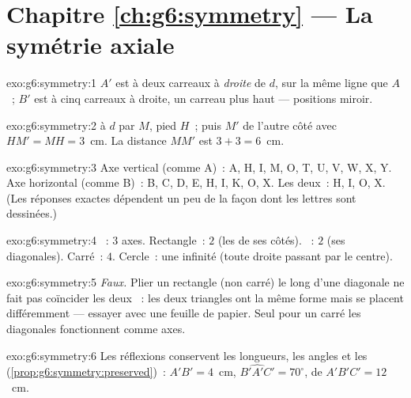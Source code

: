 \section*{Chapitre \ref{ch:g6:symmetry} --- La symétrie axiale}

\begin{solution}{exo:g6:symmetry:1}
$A'$ est à deux carreaux à \emph{droite} de $d$, sur la même ligne
que $A$~; $B'$ est à cinq carreaux à droite, un carreau plus haut ---
positions miroir.
\end{solution}

\begin{solution}{exo:g6:symmetry:2}
 à $d$ par $M$, pied $H$~; puis $M'$ de l'autre côté
avec $HM' = MH = 3$~cm. La distance $MM'$ est $3 + 3 = 6$~cm.
\end{solution}

\begin{solution}{exo:g6:symmetry:3}
Axe vertical (comme A)~: A, H, I, M, O, T, U, V, W, X, Y.
Axe horizontal (comme B)~: B, C, D, E, H, I, K, O, X.
Les deux~: H, I, O, X.
(Les réponses exactes dépendent un peu de la façon dont les lettres
sont dessinées.)
\end{solution}

\begin{solution}{exo:g6:symmetry:4}
~: $3$ axes. Rectangle~: $2$ (les  de
ses côtés). ~: $2$ (ses diagonales). Carré~: $4$. Cercle~:
une infinité (toute droite passant par le centre).
\end{solution}

\begin{solution}{exo:g6:symmetry:5}
\emph{Faux.} Plier un rectangle (non carré) le long d'une diagonale
ne fait pas coïncider les deux ~: les deux triangles ont la
même forme mais se placent différemment --- essayer avec une feuille
de papier. Seul pour un carré les diagonales fonctionnent comme axes.
\end{solution}

\begin{solution}{exo:g6:symmetry:6}
Les réflexions conservent les longueurs, les angles et les 
(\cref{prop:g6:symmetry:preserved})~: $A'B' = 4$~cm,
$\widehat{B'A'C'} = 70^\circ$,  de $A'B'C' = 12$~cm.
\end{solution}

